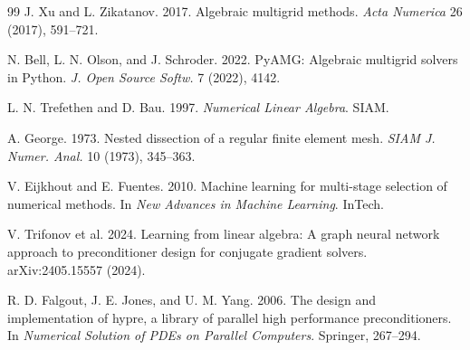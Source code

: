 \documentclass[acmsmall,screen,review]{acmart}
\begin{document}
\begin{thebibliography}{99}
 J. Xu and L. Zikatanov. 2017.
Algebraic multigrid methods. \emph{Acta Numerica} 26 (2017), 591--721.

 N. Bell, L. N. Olson, and J. Schroder. 2022.
PyAMG: Algebraic multigrid solvers in Python.
\emph{J. Open Source Softw.} 7 (2022), 4142.

 L. N. Trefethen and D. Bau. 1997.
\emph{Numerical Linear Algebra}. SIAM.

 A. George. 1973.
Nested dissection of a regular finite element mesh.
\emph{SIAM J. Numer. Anal.} 10 (1973), 345--363.

 V. Eijkhout and E. Fuentes. 2010.
Machine learning for multi-stage selection of numerical methods. In \emph{New
Advances in Machine Learning}. InTech.

 V. Trifonov et al. 2024.
Learning from linear algebra: A graph neural network approach to preconditioner
design for conjugate gradient solvers. arXiv:2405.15557 (2024).

 R. D. Falgout, J. E. Jones, and U. M. Yang. 2006.
The design and implementation of hypre, a library of parallel high performance
preconditioners. In \emph{Numerical Solution of PDEs on Parallel Computers}.
Springer, 267--294.

\end{thebibliography}
\end{document}
